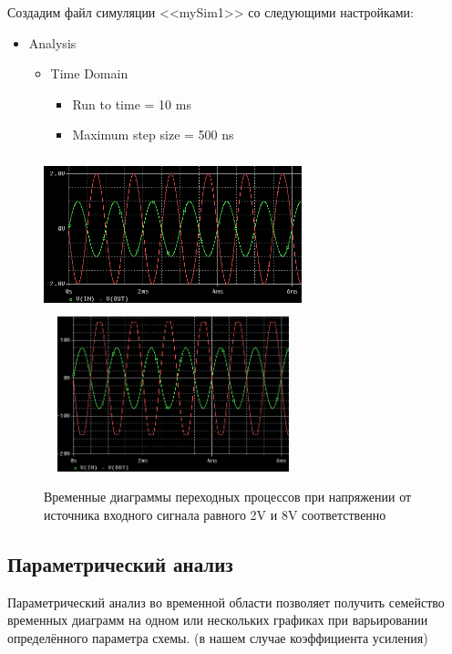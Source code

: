 \documentclass[utf8x, 12pt]{G7-32}
\begin{document}
Создадим файл симуляции <<mySim1>> со следующими настройками:

\begin{itemize}
	\item Analysis
	\begin{itemize}	
		\item Time Domain
		\begin{itemize}	
			\item Run to time = 10 ms
			\item Maximum step size = 500 ns
		\end{itemize}
	\end{itemize}
\end{itemize}

\newpage

\begin{figure}[h]
	\begin{center}
		\includegraphics[width=7.5cm, height=4.5cm]{img/waveform_1_0}
		\includegraphics[width=7.5cm, height=4.5cm]{img/waveform_1_1}
	\end{center}
	\vspace{-5mm}\caption{Временные диаграммы переходных процессов при напряжении от источника входного сигнала равного 2V и 8V соответственно}
\end{figure}	

\subsection{Параметрический анализ}
Параметрический анализ во временной области позволяет получить семейство временных диаграмм на одном или нескольких графиках при варьировании определённого параметра схемы. (в нашем случае коэффициента усиления)
\end{document}
